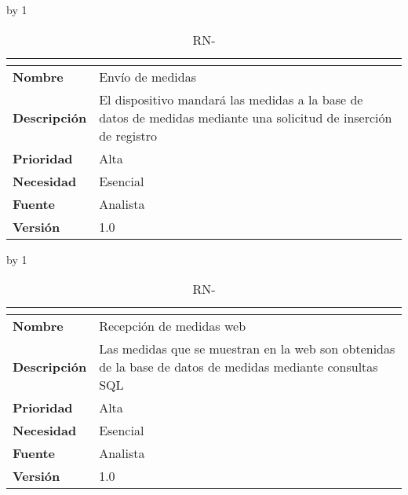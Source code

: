 \advance\rn by 1
\begin{table}[H]
	\caption{RN-\number\rn}
	\begin{tabular}{|l|p{}|}
		\hline
		\multicolumn{2}{|c|}{\cellcolor[HTML]{BFBFBF}{\color[HTML]{000000} \textbf{RN-\number\rn}}} \\ \hline
		\textbf{Nombre}      & Envío de medidas                                                                                                  \\ \hline
		\textbf{Descripción} & El dispositivo mandará las medidas a la base de datos de medidas  mediante una solicitud de inserción de registro \\ \hline
		\textbf{Prioridad}   & Alta                                                                                                              \\ \hline
		\textbf{Necesidad}   & Esencial                                                                                                          \\ \hline
		\textbf{Fuente}      & Analista                                                                                                          \\ \hline
		\textbf{Versión}     & 1.0                                                                                                               \\ \hline
	\end{tabular}
\end{table}
\advance\rn by 1
\begin{table}[H]
	\caption{RN-\number\rn}
	\begin{tabular}{|l|p{}|}
		\hline
		\multicolumn{2}{|c|}{\cellcolor[HTML]{BFBFBF}{\color[HTML]{000000} \textbf{RN-\number\rn}}} \\ \hline
		\textbf{Nombre}      & Recepción de medidas web                                                                                  \\ \hline
		\textbf{Descripción} & Las medidas que se muestran en la web son obtenidas de la base de datos de medidas mediante consultas SQL \\ \hline
		\textbf{Prioridad}   & Alta                                                                                                      \\ \hline
		\textbf{Necesidad}   & Esencial                                                                                                  \\ \hline
		\textbf{Fuente}      & Analista                                                                                                  \\ \hline
		\textbf{Versión}     & 1.0                                                                                                       \\ \hline
	\end{tabular}
\end{table}
